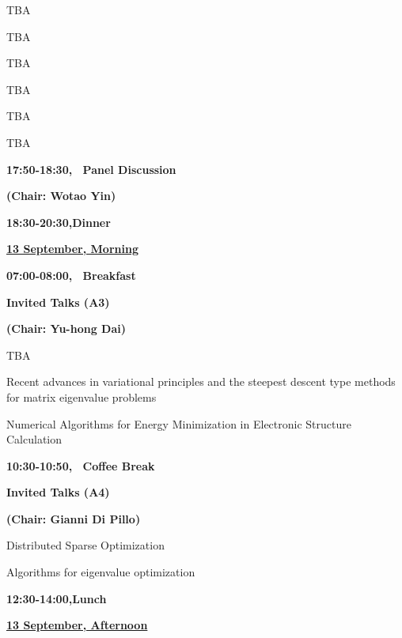  {TBA}

 {TBA}

 {TBA}

 {TBA}

 {TBA}

 {TBA}


\vskip8mm  \centerline{\bf 17:50-18:30, \ Panel Discussion } 
\vskip2mm  \centerline{\bf (Chair: Wotao Yin)}   

\vskip16mm \centerline{\bf 18:30-20:30,\quad Dinner} \vskip16mm

\newpage
\parbox[t]{5cm}{\underline{\bf  13 September,  Morning}}\hskip 2.2cm
\parbox[t]{10cm}{}
\vskip8mm \centerline{\bf 07:00-08:00, \ Breakfast} \vskip10mm
\centerline{\bf  Invited Talks (A3)} \vskip2mm \centerline{\bf
(Chair: Yu-hong Dai)} \vskip4mm

 {TBA}

 {Recent advances in variational principles
and the steepest descent type methods for matrix eigenvalue problems}

 {Numerical Algorithms for Energy Minimization
in Electronic Structure Calculation}

\vskip8mm \centerline{\bf 10:30-10:50, \ Coffee Break} \vskip8mm

\centerline{\bf Invited Talks (A4)} \vskip2mm \centerline{\bf
(Chair: Gianni Di Pillo)} \vskip4mm

 {Distributed Sparse Optimization}

 {Algorithms for eigenvalue optimization}

\vskip16mm \centerline{\bf 12:30-14:00,\quad Lunch} \vskip16mm

\noindent
\parbox[t]{5cm}{\underline{\bf 13 September, Afternoon}}\hskip 2.2cm
\hskip10mm\parbox[t]{10cm}{}
\vskip10mm


